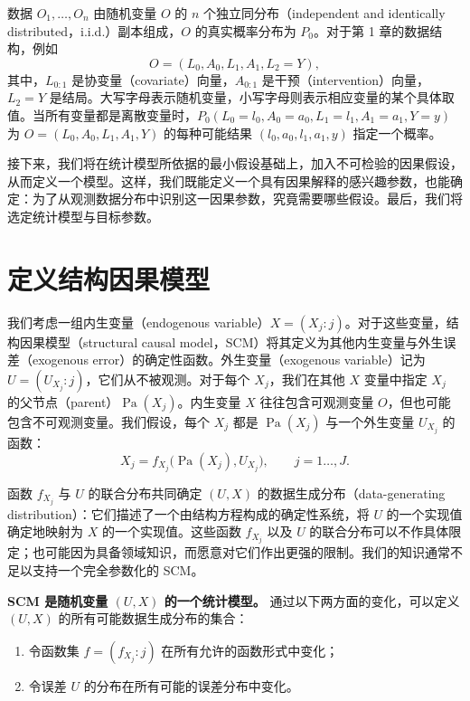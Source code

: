 数据 $O_1,\ldots,O_n$ 由随机变量 $O$ 的 $n$ 个独立同分布（independent and identically distributed，i.i.d.）副本组成，$O$ 的真实概率分布为 $P_0$。对于第 1 章的数据结构，例如
\[
 O=(L_0,A_0,L_1,A_1,L_2=Y),
\]
其中，$L_{0:1}$ 是协变量（covariate）向量，$A_{0:1}$ 是干预（intervention）向量，$L_2=Y$ 是结局。大写字母表示随机变量，小写字母则表示相应变量的某个具体取值。当所有变量都是离散变量时，$P_0(L_0=l_0,A_0=a_0,L_1=l_1,A_1=a_1,Y=y)$ 为 $O=(L_0,A_0,L_1,A_1,Y)$ 的每种可能结果 $(l_0,a_0,l_1,a_1,y)$ 指定一个概率。

接下来，我们将在统计模型所依据的最小假设基础上，加入不可检验的因果假设，从而定义一个模型。这样，我们既能定义一个具有因果解释的感兴趣参数，也能确定：为了从观测数据分布中识别这一因果参数，究竟需要哪些假设。最后，我们将选定统计模型与目标参数。

\section{定义结构因果模型}
\label{sec:ch02-scm}

我们考虑一组内生变量（endogenous variable）$X=(X_j:j)$。对于这些变量，结构因果模型（structural causal model，SCM）将其定义为其他内生变量与外生误差（exogenous error）的确定性函数。外生变量（exogenous variable）记为 $U=(U_{X_j}:j)$，它们从不被观测。对于每个 $X_j$，我们在其他 $X$ 变量中指定 $X_j$ 的父节点（parent）$\operatorname{Pa}(X_j)$。内生变量 $X$ 往往包含可观测变量 $O$，但也可能包含不可观测变量。我们假设，每个 $X_j$ 都是 $\operatorname{Pa}(X_j)$ 与一个外生变量 $U_{X_j}$ 的函数：
\[
 X_j=f_{X_j}\bigl(\operatorname{Pa}(X_j),U_{X_j}\bigr),
 \qquad j=1\ldots,J.
\]

函数 $f_{X_j}$ 与 $U$ 的联合分布共同确定 $(U,X)$ 的数据生成分布（data-generating distribution）：它们描述了一个由结构方程构成的确定性系统，将 $U$ 的一个实现值确定地映射为 $X$ 的一个实现值。这些函数 $f_{X_j}$ 以及 $U$ 的联合分布可以不作具体限定；也可能因为具备领域知识，而愿意对它们作出更强的限制。我们的知识通常不足以支持一个完全参数化的 SCM。

\begin{sourcebox}
\textbf{SCM 是随机变量 $(U,X)$ 的一个统计模型。}
通过以下两方面的变化，可以定义 $(U,X)$ 的所有可能数据生成分布的集合：
\begin{enumerate}[itemsep=.15em,topsep=.2em]
 \item 令函数集 $f=(f_{X_j}:j)$ 在所有允许的函数形式中变化；
 \item 令误差 $U$ 的分布在所有可能的误差分布中变化。
\end{enumerate}
\end{sourcebox}

